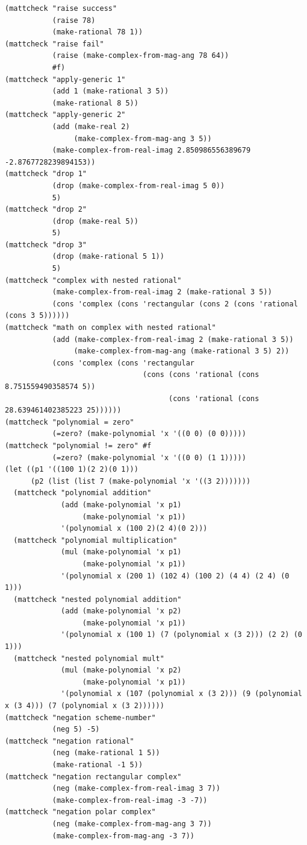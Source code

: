 \documentclass[final,fleqn,titlepage,twoside]{article}
\begin{document}
\begin{verbatim}
(mattcheck "raise success"
           (raise 78)
           (make-rational 78 1))
(mattcheck "raise fail"
           (raise (make-complex-from-mag-ang 78 64))
           #f)
(mattcheck "apply-generic 1"
           (add 1 (make-rational 3 5))
           (make-rational 8 5))
(mattcheck "apply-generic 2"
           (add (make-real 2)
                (make-complex-from-mag-ang 3 5))
           (make-complex-from-real-imag 2.850986556389679 -2.8767728239894153))
(mattcheck "drop 1"
           (drop (make-complex-from-real-imag 5 0))
           5)
(mattcheck "drop 2"
           (drop (make-real 5))
           5)
(mattcheck "drop 3"
           (drop (make-rational 5 1))
           5)
(mattcheck "complex with nested rational"
           (make-complex-from-real-imag 2 (make-rational 3 5))
           (cons 'complex (cons 'rectangular (cons 2 (cons 'rational (cons 3 5))))))
(mattcheck "math on complex with nested rational"
           (add (make-complex-from-real-imag 2 (make-rational 3 5))
                (make-complex-from-mag-ang (make-rational 3 5) 2))
           (cons 'complex (cons 'rectangular
                                (cons (cons 'rational (cons 8.751559490358574 5))
                                      (cons 'rational (cons 28.639461402385223 25))))))
(mattcheck "polynomial = zero"
           (=zero? (make-polynomial 'x '((0 0) (0 0)))))
(mattcheck "polynomial != zero" #f
           (=zero? (make-polynomial 'x '((0 0) (1 1)))))
(let ((p1 '((100 1)(2 2)(0 1)))
      (p2 (list (list 7 (make-polynomial 'x '((3 2)))))))
  (mattcheck "polynomial addition"
             (add (make-polynomial 'x p1)
                  (make-polynomial 'x p1))
             '(polynomial x (100 2)(2 4)(0 2)))
  (mattcheck "polynomial multiplication"
             (mul (make-polynomial 'x p1)
                  (make-polynomial 'x p1))
             '(polynomial x (200 1) (102 4) (100 2) (4 4) (2 4) (0 1)))
  (mattcheck "nested polynomial addition"
             (add (make-polynomial 'x p2)
                  (make-polynomial 'x p1))
             '(polynomial x (100 1) (7 (polynomial x (3 2))) (2 2) (0 1)))
  (mattcheck "nested polynomial mult"
             (mul (make-polynomial 'x p2)
                  (make-polynomial 'x p1))
             '(polynomial x (107 (polynomial x (3 2))) (9 (polynomial x (3 4))) (7 (polynomial x (3 2))))))
(mattcheck "negation scheme-number"
           (neg 5) -5)
(mattcheck "negation rational"
           (neg (make-rational 1 5))
           (make-rational -1 5))
(mattcheck "negation rectangular complex"
           (neg (make-complex-from-real-imag 3 7))
           (make-complex-from-real-imag -3 -7))
(mattcheck "negation polar complex"
           (neg (make-complex-from-mag-ang 3 7))
           (make-complex-from-mag-ang -3 7))


\end{verbatim}
\end{document}
